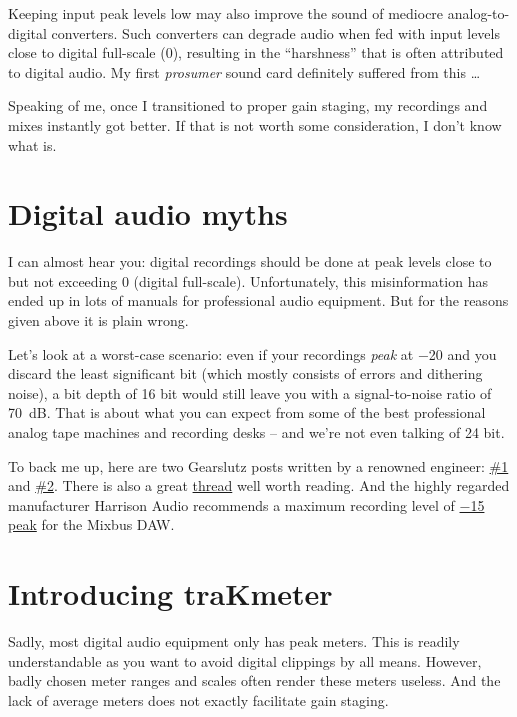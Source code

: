 Keeping input peak levels low may also improve the sound of mediocre
analog-to-digital converters.  Such converters can degrade audio when
fed with input levels close to digital full-scale (\SI{0}{\dBFS}),
resulting in the ``harshness'' that is often attributed to digital
audio.  My first \emph{prosumer} sound card definitely suffered from
this \dots

Speaking of me, once I transitioned to proper gain staging, my
recordings and mixes instantly got better.  If that is not worth some
consideration, I don't know what is.

\section{Digital audio myths}
\label{sec:digital_audio_myths}

I can almost hear you: digital recordings should be done at peak
levels close to but not exceeding \SI{0}{\dBFS} (digital full-scale).
Unfortunately, this misinformation has ended up in lots of manuals for
professional audio equipment.  But for the reasons given above it is
plain wrong.

Let's look at a worst-case scenario: even if your recordings
\emph{peak} at \SI{-20}{\dBFS} and you discard the least significant
bit (which mostly consists of errors and dithering noise), a bit depth
of 16 bit would still leave you with a signal-to-noise ratio of
\SI{70}{\dB}.  That is about what you can expect from some of the best
professional analog tape machines and recording desks -- and we're not
even talking of 24 bit.

To back me up, here are two Gearslutz posts written by a renowned
engineer:
\href{https://www.gearslutz.com/board/showpost.php?p=10739624&postcount=9}{\#1}
and
\href{https://www.gearslutz.com/board/showpost.php?p=9909382&postcount=96}{\#2}.
There is also a great
\href{http://www.gearslutz.com/board/5062929-post1.html}{thread} well
worth reading.  And the highly regarded manufacturer Harrison Audio
recommends a maximum recording level of
\href{http://www.harrisonconsoles.com/mixbus/mixbus4-live-manual/1/en/topic/gain-staging}{\SI{-15}{\dBFS}
  peak} for the Mixbus DAW.

\section{Introducing traKmeter}
\label{sec:introducing_trakmeter}

Sadly, most digital audio equipment only has peak meters.  This is
readily understandable as you want to avoid digital clippings by all
means.  However, badly chosen meter ranges and scales often render
these meters useless.  And the lack of average meters does not exactly
facilitate gain staging.


